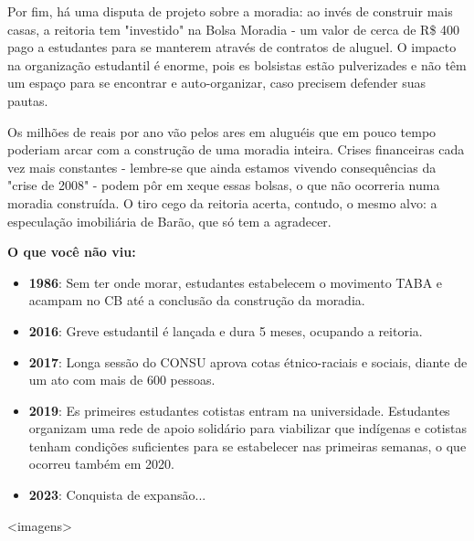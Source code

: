 Por fim, há uma disputa de projeto sobre a moradia: ao invés de construir mais casas,
a reitoria tem "investido" na Bolsa Moradia - um valor de cerca de R\$ 400 pago a
estudantes para se manterem através de contratos de aluguel. O impacto na organização
estudantil é enorme, pois es bolsistas estão pulverizades e não têm um espaço para se
encontrar e auto-organizar, caso precisem defender suas pautas.

Os milhões de reais por ano vão pelos ares em aluguéis que em pouco tempo poderiam arcar com a construção de uma moradia inteira. Crises financeiras cada vez mais constantes - lembre-se que ainda estamos vivendo consequências da "crise de 2008" -
podem pôr em xeque essas bolsas, o que não ocorreria numa moradia construída. O tiro
cego da reitoria acerta, contudo, o mesmo alvo: a especulação imobiliária de Barão, que
só tem a agradecer.

\vspace{1em}
\textbf{O que você não viu:}
\vspace{-0.5em}
\begin{itemize}
    \setlength\itemsep{-0.2em}
    \item \textbf{1986}: Sem ter onde morar, estudantes estabelecem o movimento TABA e acampam no CB até a conclusão da construção da moradia.
    \item \textbf{2016}: Greve estudantil é lançada e dura 5 meses, ocupando a reitoria.
    \item \textbf{2017}: Longa sessão do CONSU aprova cotas étnico-raciais e sociais, diante de um ato com mais de 600 pessoas.
    \item \textbf{2019}: Es primeires estudantes cotistas entram na universidade. Estudantes organizam uma rede de apoio solidário para viabilizar que indígenas e cotistas tenham condições suficientes para se estabelecer nas primeiras semanas, o que ocorreu também em 2020.
    \item \textbf{2023}: Conquista de expansão...
\end{itemize}

<imagens>